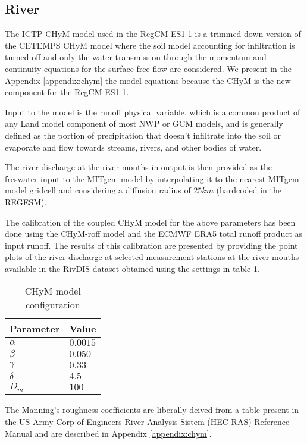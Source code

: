 \documentclass[journal abbreviation, manuscript]{copernicus}
\begin{document}
\subsection{River}

The ICTP CHyM model used in the RegCM-ES1-1 is a trimmed down version of the
CETEMPS CHyM model where the soil model accounting for infiltration is turned
off and only the water transmission through the momentum and continuity
equations for the surface free flow are considered. We present in the
Appendix \ref{appendix:chym} the model equations because the CHyM is the new
component for the RegCM-ES1-1.

Input to the model is the runoff physical variable, which is a common product
of any Land model component of most NWP or GCM models, and is generally defined
as the portion of precipitation that doesn't infiltrate into the soil or
evaporate and flow towards streams, rivers, and other bodies of water.

The river discharge at the river mouths in output is then provided as the
freswater input to the MITgcm model by interpolating it to the nearest MITgcm
model gridcell and considering a diffusion radius of $25 km$
(hardcoded in the REGESM).

The calibration of the coupled CHyM model for the above parameters has been
done using the CHyM-roff model and the ECMWF ERA5 total runoff product as
input runoff. The results of this calibration are presented by providing the
point plots of the river discharge at selected measurement stations at the
river mouths available in the RivDIS dataset obtained using the
settings in table \ref{table:chym_conf}.

\begin{table}[]
    \begin{tabular}{|l|l|}
        \hline
        Parameter & Value \\
        \hline
        $\alpha$ & $0.0015$ \\
        $\beta$ & $0.050$ \\
        $\gamma$ & $0.33$ \\
        $\delta$ & $4.5$ \\
        $D_m$ & $100$ \\
        \hline
  \end{tabular}
    \caption{CHyM model configuration}
    \label{table:chym_conf}
\end{table}

The Manning's roughness coefficients are liberally deived from a table
present in the US Army Corp of Engineers River Analysis Sistem (HEC-RAS)
Reference Manual \citep{brunner-2020} and are described in Appendix
\ref{appendix:chym}.
\end{document}
